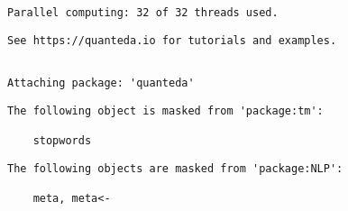\documentclass[
  12pt,
  letterpaper,
  DIV=11,
  numbers=noendperiod]{scrartcl}
\begin{document}
\begin{verbatim}
Parallel computing: 32 of 32 threads used.
\end{verbatim}

\begin{verbatim}
See https://quanteda.io for tutorials and examples.
\end{verbatim}

\begin{verbatim}

Attaching package: 'quanteda'
\end{verbatim}

\begin{verbatim}
The following object is masked from 'package:tm':

    stopwords
\end{verbatim}

\begin{verbatim}
The following objects are masked from 'package:NLP':

    meta, meta<-
\end{verbatim}
\end{document}

